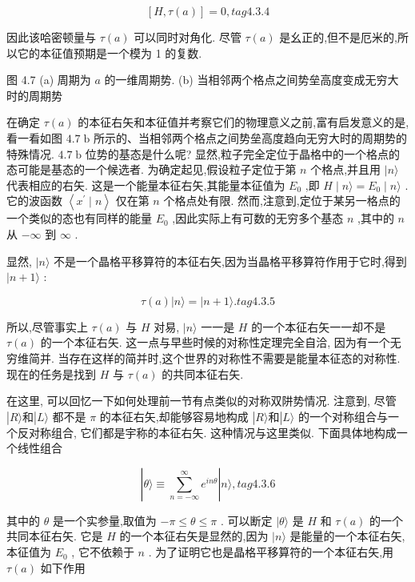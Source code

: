 $$
\left\lbrack {H,\tau \left( a\right) }\right\rbrack = 0, tag{4.3.4}
$$

因此该哈密顿量与 $\tau \left( a\right)$ 可以同时对角化. 尽管 $\tau \left( a\right)$ 是幺正的,但不是厄米的,所以它的本征值预期是一个模为 1 的复数.


图 4.7 (a) 周期为 $a$ 的一维周期势. (b) 当相邻两个格点之间势垒高度变成无穷大时的周期势

在确定 $\tau \left( a\right)$ 的本征右矢和本征值并考察它们的物理意义之前,富有启发意义的是, 看一看如图 ${4.7}\mathrm{\;b}$ 所示的、当相邻两个格点之间势垒高度趋向无穷大时的周期势的特殊情况. ${4.7}\mathrm{\;b}$ 位势的基态是什么呢? 显然,粒子完全定位于晶格中的一个格点的态可能是基态的一个候选者. 为确定起见,假设粒子定位于第 $n$ 个格点,并且用 $|n\rangle$ 代表相应的右矢. 这是一个能量本征右矢,其能量本征值为 ${E}_{0}$ ,即 $H \mid n\rangle = {E}_{0} \mid n\rangle$ . 它的波函数 $\left\langle {{x}^{\prime } \mid n}\right\rangle$ 仅在第 $n$ 个格点处有限. 然而,注意到,定位于某另一格点的一个类似的态也有同样的能量 ${E}_{0}$ ,因此实际上有可数的无穷多个基态 $n$ ,其中的 $n$ 从 $- \infty$ 到 $\infty$ .

显然, $|n\rangle$ 不是一个晶格平移算符的本征右矢,因为当晶格平移算符作用于它时,得到 $|n + 1\rangle$ :

$$
\tau \left( a\right) \left| {n\rangle = }\right| n + 1\rangle . tag{4.3.5}
$$

所以,尽管事实上 $\tau \left( a\right)$ 与 $H$ 对易, $|n\rangle$ 一一是 $H$ 的一个本征右矢一一却不是 $\tau \left( a\right)$ 的一个本征右矢. 这一点与早些时候的对称性定理完全自洽, 因为有一个无穷维简并. 当存在这样的简并时,这个世界的对称性不需要是能量本征态的对称性. 现在的任务是找到 $H$ 与 $\tau \left( a\right)$ 的共同本征右矢.

在这里, 可以回忆一下如何处理前一节有点类似的对称双阱势情况. 注意到, 尽管 $\left| {R\rangle \text{和}}\right| L\rangle$ 都不是 $\pi$ 的本征右矢,却能够容易地构成 $\left| {R\rangle \text{和}}\right| L\rangle$ 的一个对称组合与一个反对称组合, 它们都是宇称的本征右矢. 这种情况与这里类似. 下面具体地构成一个线性组合

$$
|\theta \rangle \equiv \mathop{\sum }\limits_{{n = - \infty }}^{\infty }{e}^{in\theta }|n\rangle , tag{4.3.6}
$$

其中的 $\theta$ 是一个实参量,取值为 $- \pi \leq \theta \leq \pi$ . 可以断定 $|\theta \rangle$ 是 $H$ 和 $\tau \left( a\right)$ 的一个共同本征右矢. 它是 $H$ 的一个本征右矢是显然的,因为 $|n\rangle$ 是能量的一个本征右矢,本征值为 ${E}_{0}$ , 它不依赖于 $n$ . 为了证明它也是晶格平移算符的一个本征右矢,用 $\tau \left( a\right)$ 如下作用

